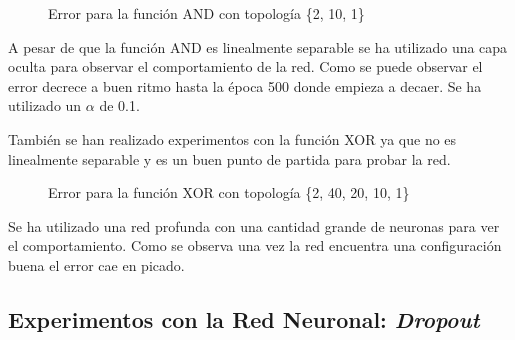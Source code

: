 \begin{figure}[H]
    \centering
    
    
    \caption{Error para la función AND con topología \{2, 10, 1\}} 
    \label{fig:NetAndExperiment}
\end{figure}

A pesar de que la función AND es linealmente separable se ha utilizado una capa oculta para observar el comportamiento de la red. Como se puede observar el error decrece a buen ritmo hasta la época 500 donde empieza a decaer. Se ha utilizado un $\alpha$ de 0.1.

También se han realizado experimentos con la función XOR ya que no es linealmente separable y es un buen punto de partida para probar la red.

\begin{figure}[H]
    \centering
    
    
    \caption{Error para la función XOR con topología \{2, 40, 20, 10, 1\}} 
    \label{fig:NetXorExperiment}
\end{figure}

Se ha utilizado una red profunda con una cantidad grande de neuronas para ver el comportamiento. Como se observa una vez la red encuentra una configuración buena el error cae en picado.

\newpage
\subsection{Experimentos con la Red Neuronal: \textit{Dropout}}
\label{subsubsec:nnexperiments:Dropout}

